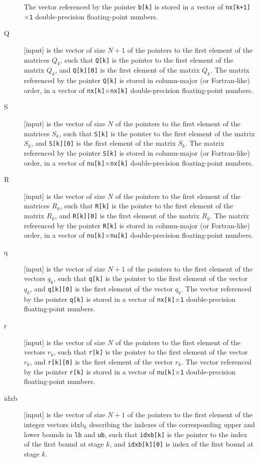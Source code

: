 \documentclass{report}
\begin{document}
\begin{description}
The vector referenced by the pointer {\tt b[k]} is stored in a vector of {\tt nx[k+1]$\times$1} double-precision floating-point numbers.
\item[Q] [input] is the vector of size $N+1$ of the pointers to the first element of the matrices $Q_k$, such that {\tt Q[k]} is the pointer to the first element of the matrix $Q_k$, and {\tt Q[k][0]} is the first element of the matrix $Q_k$.
The matrix referenced by the pointer {\tt Q[k]} is stored in column-major (or Fortran-like) order, in a vector of {\tt nx[k]$\times$nx[k]} double-precision floating-point numbers.
\item[S] [input] is the vector of size $N$ of the pointers to the first element of the matrices $S_k$, such that {\tt S[k]} is the pointer to the first element of the matrix $S_k$, and {\tt S[k][0]} is the first element of the matrix $S_k$.
The matrix referenced by the pointer {\tt S[k]} is stored in column-major (or Fortran-like) order, in a vector of {\tt nu[k]$\times$nx[k]} double-precision floating-point numbers.
\item[R] [input] is the vector of size $N$ of the pointers to the first element of the matrices $R_k$, such that {\tt R[k]} is the pointer to the first element of the matrix $R_k$, and {\tt R[k][0]} is the first element of the matrix $R_k$.
The matrix referenced by the pointer {\tt R[k]} is stored in column-major (or Fortran-like) order, in a vector of {\tt nu[k]$\times$nu[k]} double-precision floating-point numbers.
\item[q] [input] is the vector of size $N+1$ of the pointers to the first element of the vectors $q_k$, such that {\tt q[k]} is the pointer to the first element of the vector $q_k$, and {\tt q[k][0]} is the first element of the vector $q_k$.
The vector referenced by the pointer {\tt q[k]} is stored in a vector of {\tt nx[k]$\times$1} double-precision floating-point numbers.
\item[r] [input] is the vector of size $N$ of the pointers to the first element of the vectors $r_k$, such that {\tt r[k]} is the pointer to the first element of the vector $r_k$, and {\tt r[k][0]} is the first element of the vector $r_k$.
The vector referenced by the pointer {\tt r[k]} is stored in a vector of {\tt nu[k]$\times$1} double-precision floating-point numbers.
\item[idxb] [input] is the vector of size $N+1$ of the pointers to the first element of the integer vectors $\mathrm{idxb}_k$ describing the indexes of the corresponding upper and lower bounds in {\tt lb} and {\tt ub}, such that {\tt idxb[k]} is the pointer to the index of the first bound at stage $k$, and {\tt idxb[k][0]} is index of the first bound at stage $k$.

\end{description}
\end{document}
